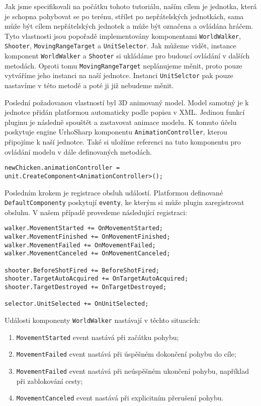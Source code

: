 Jak jsme specifikovali na počátku tohoto tutoriálu, naším cílem je jednotka, která je schopna pohybovat se po terénu, střílet po nepřátelských jednotkách, sama může být cílem nepřátelských jednotek a může být označena a ovládána hráčem. Tyto vlastnosti jsou popořadě implementovány komponentami \texttt{WorldWalker}, \texttt{Shooter}, \texttt{MovingRangeTarget} a \texttt{UnitSelector}. Jak můžeme vidět, instance komponent \texttt{WorldWalker} a \texttt{Shooter} si ukládáme pro budoucí ovládání v dalších metodách. Oproti tomu \texttt{MovingRangeTarget} neplánujeme měnit, proto pouze vytváříme jeho instanci na naší jednotce. Instanci \texttt{UnitSelctor} pak pouze nastavíme v této metodě a poté ji již nebudeme měnit.


Poslední požadovanou vlastností byl 3D animovaný model. Model samotný je k jednotce přidán platformou automaticky podle popisu v XML. Jedinou funkcí pluginu je následně spouštět a zastavovat animace modelu. K tomuto účelu poskytuje engine UrhoSharp komponentu \texttt{AnimationController}, kterou připojíme k naší jednotce. Také si uložíme referenci na tuto komponentu pro ovládání modelu v dále definovaných metodách.
\begin{lstlisting}
newChicken.animationController = 
unit.CreateComponent<AnimationController>();
\end{lstlisting}

Posledním krokem je registrace obsluh událostí. Platformou definované \texttt{DefaultComponenty} poskytují \texttt{eventy}, ke kterým si může plugin zaregistrovat obsluhu. V našem případě provedeme následující registraci:

\begin{lstlisting}
walker.MovementStarted += OnMovementStarted;
walker.MovementFinished += OnMovementFinished;
walker.MovementFailed += OnMovementFailed;
walker.MovementCanceled += OnMovementCanceled;

shooter.BeforeShotFired += BeforeShotFired;
shooter.TargetAutoAcquired += OnTargetAutoAcquired;
shooter.TargetDestroyed += OnTargetDestroyed;

selector.UnitSelected += OnUnitSelected;
\end{lstlisting}

Události komponenty \texttt{WorldWalker} nastávají v těchto situacích:
\begin{enumerate}
	\item \texttt{MovementStarted} event nastává při začátku pohybu;
	\item \texttt{MovementFailed} event nastává při úspěšném dokončení pohybu do cíle;
	\item \texttt{MovementFailed} event nastává při neúspěšném ukončení pohybu, například při zablokování cesty;
	\item \texttt{MovementCanceled} event nastává při explicitním přerušení pohybu.
\end{enumerate}

